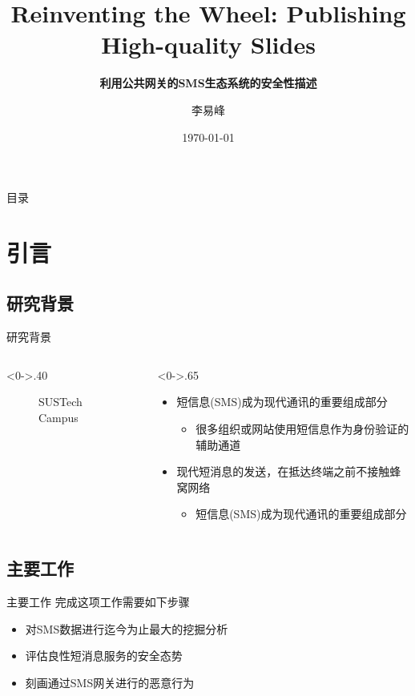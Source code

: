 \documentclass[UTF8,10pt,aspectratio=43]{ctexbeamer}
\title{Reinventing the Wheel: Publishing High-quality Slides}
\subtitle{\fontsize{9pt}{14pt}\textbf{利用公共网关的SMS生态系统的安全性描述}}
\author{李易峰}
\institute{中北大学英雄与联盟工程学院}
\date{\today}
\begin{document}

\frame{\titlepage}

\section[目录]{}   %
\begin{frame}{目录}
\tableofcontents
\end{frame}

\section{引言}  %
\subsection{研究背景}
\begin{frame}{研究背景}
\begin{columns}[T] %
\begin{column}<0->{.40\textwidth}
	\begin{figure}[thpb]
		\centering
		\resizebox{1\linewidth}{!}{
		}
		\caption{SUSTech Campus~\cite{DBLP:conf/osdi/AbadiBCCDDDGIIK16}}
		\label{fig:campus}
	\end{figure}
\end{column}%
\hfill%
\begin{column}<0->{.65\textwidth}
	\begin{itemize}
		\item<1-> 短信息(SMS)成为现代通讯的重要组成部分
		\begin{itemize}
			\item<1-> 很多组织或网站使用短信息作为身份验证的辅助通道
		\end{itemize}
		\item<2-> 现代短消息的发送，在抵达终端之前不接触蜂窝网络
		\begin{itemize}
			\item<2-> 短信息(SMS)成为现代通讯的重要组成部分
		\end{itemize}
	\end{itemize}
\end{column}%
\end{columns}
\end{frame}
\subsection{主要工作}
\begin{frame}{主要工作}
完成这项工作需要如下步骤
\begin{itemize}
\item  对SMS数据进行迄今为止最大的挖掘分析
\item 评估良性短消息服务的安全态势
\item  刻画通过SMS网关进行的恶意行为
\end{itemize}
\end{frame}
\end{document}
